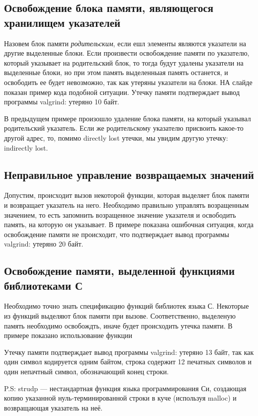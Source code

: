 \documentclass[10pt]{article}
\begin{document}
\subsection{Освобождение блока памяти, являющегося хранилищем указателей}
Назовем блок памяти {\it родительским}, если ешл элементы
являются указатели на другие выделенные блоки. Если произвести освобождение памяти по указателю,
который указывает на родительский блок, то тогда будут удалены указатели на выделенные блоки,
но при этом память выделенныая память останется, и освободить ее будет невозможно, так как утеряны
указатели на блоки. НА слайде показан пример кода подобной ситуации. Утечку памяти подтверждает
вывод программы valgrind: утеряно 10 байт.

В предыдущем примере произошло удаление блока памяти, на который указывал
родительский указатель. Если же родительскому указателю присвоить какое-то другой 
адрес, то, помимо directly lost утечки, мы увидим другую утечку: indirectly lost.

\subsection{Неправильное управление возвращаемых значений}
Допустим, происходит вызов некоторой функции, которая выделяет блок памяти
и возвращает указатель на него. Необходимо правильно управлять возращенным значением,
то есть запомнить возращенное значение указателя и освободить память, на которую он указывает.
В примере показана ошибочная ситуация, когда освобождение памяти не происходит, что подтверждает
вывод программы valgrind: утеряно 20 байт.

\subsection{Освобождение памяти, выделенной функциями библиотеками С}
Необходимо точно знать спецификацию функций библиотек языка С. Некоторые из функций
выделяют блок памяти при вызове. Соответственно, выделеную память необходимо освобождть, иначе будет происходить
утечка памяти. В примере показано использование функции

Утечку памяти подтверждает вывод программы valgrind: утеряно 13 байт, так как один символ кодируется одним байтом,
строка содержит 12 печатных символов и один непачтный символ, обозначающий конец строки.

P.S: strudp --- 
нестандартная функция языка программирования Си, создающая копию указанной нуль-терминированной строки в куче (используя malloc) и возвращающая указатель на неё.
\end{document}
